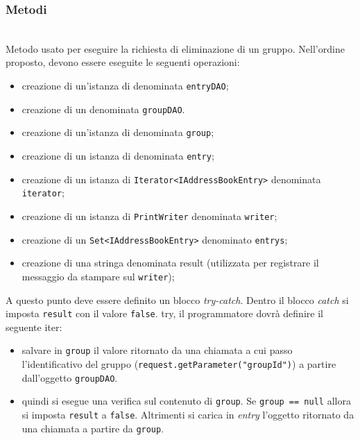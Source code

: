 \subsubsection*{Metodi}
\begin{description}
	\item{}\\	
	Metodo usato per eseguire la richiesta di eliminazione di un gruppo. Nell'ordine proposto, devono essere eseguite le seguenti operazioni:
	\begin{itemize}
		\item creazione di un'istanza di  denominata \texttt{entryDAO};
		\item creazione di un  denominata \texttt{groupDAO}.
		\item creazione di un'istanza di  denominata \texttt{group};
		\item creazione di un istanza di  denominata \texttt{entry};
		\item creazione di un istanza di \texttt{Iterator<IAddressBookEntry>} denominata \texttt{iterator};
		\item creazione di un istanza di \texttt{PrintWriter} denominata \texttt{writer};
		\item creazione di un \texttt{Set<IAddressBookEntry>} denominato \texttt{entrys};
		\item creazione di una stringa denominata result (utilizzata per registrare il messaggio da stampare sul \texttt{writer});
	\end{itemize} 
	A questo punto deve essere definito un blocco \textit{try-catch}. Dentro il blocco \textit{catch} si  imposta \texttt{result} con il valore \texttt{false}. {try}, il programmatore dovrà definire il seguente iter:
	\begin{itemize}
		\item salvare in \texttt{group} il valore ritornato da una chiamata  a cui passo l'identificativo del gruppo (\texttt{request.getParameter("groupId")}) a partire dall'oggetto \texttt{groupDAO}.
		\item quindi si esegue una verifica sul contenuto di \texttt{group}. Se \texttt{group == null} allora si imposta \texttt{result} a \texttt{false}. Altrimenti si carica in \textit{entry} l'oggetto ritornato da una chiamata  a partire da \texttt{group}.

\end{itemize}
\end{description}
